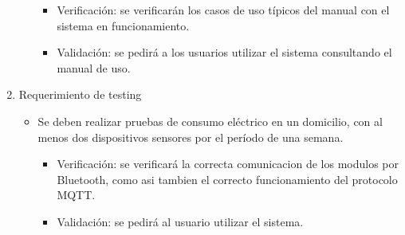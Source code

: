 \documentclass[
11pt, %
]{charter}
\begin{document}
\begin{enumerate}
\begin{itemize}
		\begin{itemize}
		\item Verificación: se verificarán los casos de uso típicos del manual con el sistema en funcionamiento.
		\item Validación: se pedirá a los usuarios utilizar el sistema consultando el manual de uso.
		\end{itemize}
		
		\end{itemize}
		
		
		
	
			
	\item Requerimiento de testing
		\begin{itemize}
		\item Se deben realizar pruebas de consumo eléctrico en un domicilio, con al menos dos dispositivos sensores por el período de una semana.
			\begin{itemize}
			\item Verificación: se verificará la correcta comunicacion de los modulos por Bluetooth, como asi tambien el correcto funcionamiento del protocolo MQTT.
			\item Validación: se pedirá al usuario utilizar el sistema.
			\end{itemize}
			

\end{itemize}
\end{enumerate}
\end{document}
